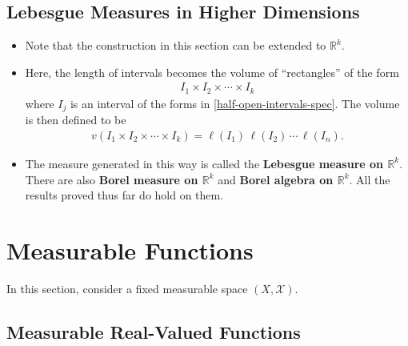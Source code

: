 \documentclass[10pt]{article}
\newcommand{\mcal}[1]{\mathcal{#1}}
\newcommand{\Real}{\mathbb{R}}
\begin{document}
\subsection{Lebesgue Measures in Higher Dimensions}

\begin{itemize}
  \item Note that the construction in this section can be extended to $\Real^k$.
  
  \item Here, the length of intervals becomes the volume of ``rectangles'' of the form
  \begin{align*}
    I_1 \times I_2 \times \dotsb \times I_k
  \end{align*}
  where $I_j$ is an interval of the forms in \eqref{half-open-intervals-spec}. The volume is then defined to be
  \begin{align*}
    v(I_1 \times I_2 \times \dotsb \times I_k) = \ell(I_1)\, \ell(I_2)\, \dotsb\, \ell(I_n).
  \end{align*}

  \item The measure generated in this way is called the {\bf Lebesgue measure on $\Real^k$}. There are also {\bf Borel measure on $\Real^k$} and {\bf Borel algebra on $\Real^k$}. All the results proved thus far do hold on them. 
\end{itemize}

\section{Measurable Functions}

In this section, consider a fixed measurable space $(X,\mcal{X})$.

\subsection{Measurable Real-Valued Functions}
\end{document}
